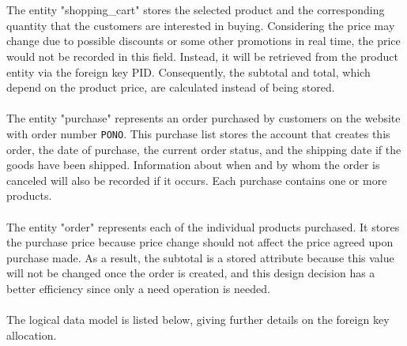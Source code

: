 \documentclass{article}
\begin{document}
\\\\
The entity "shopping\_cart" stores the selected product and the corresponding quantity that the customers are interested in buying. Considering the price may change due to possible discounts or some other promotions in real time, the price would not be recorded in this field. Instead, it will be retrieved from the product entity via the foreign key PID. Consequently, the subtotal and total, which depend on the product price, are calculated instead of being stored.
\\\\
The entity "purchase" represents an order purchased by customers on the website with order number \verb|PONO|. This purchase list stores the account that creates this order, the date of purchase, the current order status, and the shipping date if the goods have been shipped. Information about when and by whom the order is canceled will also be recorded if it occurs. Each purchase contains one or more products.
\\\\
The entity "order" represents each of the individual products purchased. It stores the purchase price because price change should not affect the price agreed upon purchase made. As a result, the subtotal is a stored attribute because this value will not be changed once the order is created, and this design decision has a better efficiency since only a need operation is needed.
\\\\
The logical data model is listed below, giving further details on the foreign key allocation.
\end{document}
